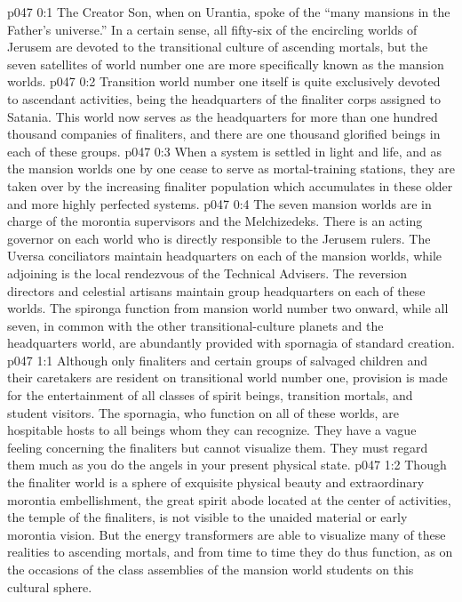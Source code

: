 \author{Brilliant Evening Star}
\vs p047 0:1 The Creator Son, when on Urantia, spoke of the “many mansions in the Father’s universe.” In a certain sense, all fifty\hyp{}six of the encircling worlds of Jerusem are devoted to the transitional culture of ascending mortals, but the seven satellites of world number one are more specifically known as the mansion worlds.
\vs p047 0:2 Transition world number one itself is quite exclusively devoted to ascendant activities, being the headquarters of the finaliter corps assigned to Satania. This world now serves as the headquarters for more than one hundred thousand companies of finaliters, and there are one thousand glorified beings in each of these groups.
\vs p047 0:3 When a system is settled in light and life, and as the mansion worlds one by one cease to serve as mortal\hyp{}training stations, they are taken over by the increasing finaliter population which accumulates in these older and more highly perfected systems.
\vs p047 0:4 The seven mansion worlds are in charge of the morontia supervisors and the Melchizedeks. There is an acting governor on each world who is directly responsible to the Jerusem rulers. The Uversa conciliators maintain headquarters on each of the mansion worlds, while adjoining is the local rendezvous of the Technical Advisers. The reversion directors and celestial artisans maintain group headquarters on each of these worlds. The spironga function from mansion world number two onward, while all seven, in common with the other transitional\hyp{}culture planets and the headquarters world, are abundantly provided with spornagia of standard creation.\plusone
{}
\vs p047 1:1 Although only finaliters and certain groups of salvaged children and their caretakers are resident on transitional world number one, provision is made for the entertainment of all classes of spirit beings, transition mortals, and student visitors. The spornagia, who function on all of these worlds, are hospitable hosts to all beings whom they can recognize. They have a vague feeling concerning the finaliters but cannot visualize them. They must regard them much as you do the angels in your present physical state.
\vs p047 1:2 Though the finaliter world is a sphere of exquisite physical beauty and extraordinary morontia embellishment, the great spirit abode located at the center of activities, the temple of the finaliters, is not visible to the unaided material or early morontia vision. But the energy transformers are able to visualize many of these realities to ascending mortals, and from time to time they do thus function, as on the occasions of the class assemblies of the mansion world students on this cultural sphere.

